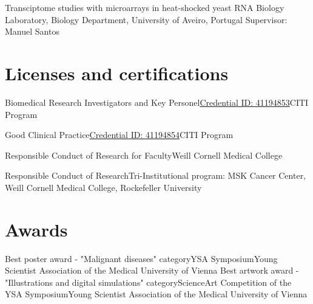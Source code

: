\documentclass[11pt,a4paper,roman]{moderncv} %
\begin{document}
            {Transciptome studies with microarrays in heat-shocked yeast}
            {RNA Biology Laboratory, Biology Department, University of Aveiro, Portugal}{}
            {}
            {Supervisor: Manuel Santos}


\section{Licenses and certifications}

        {Biomedical Research Investigators and Key Personel}{\href{https://www.citiprogram.org/verify/?w9102e99f-9a51-41fc-993b-e50ba7dafc36-41194853}{Credential ID: 41194853}}{}{}{CITI Program}

        {Good Clinical Practice}{\href{https://www.citiprogram.org/verify/?w50fab502-7953-4e4c-ac09-87d4aa204f2f-41194854}{Credential ID: 41194854}}{}{}{CITI Program}

        {Responsible Conduct of Research for Faculty}{}{}{}{Weill Cornell Medical College}

        {Responsible Conduct of Research}{}{}{}{Tri-Institutional program: MSK Cancer Center, Weill Cornell Medical College, Rockefeller University}



\section{Awards}
        {Best poster award - "Malignant diseases" category}{YSA Symposium}{}{}{Young Scientist Association of the Medical University of Vienna}
        {Best artwork award - "Illustrations and digital simulations" category}{ScienceArt Competition of the YSA Symposium}{}{}{Young Scientist Association of the Medical University of Vienna}
\end{document}
